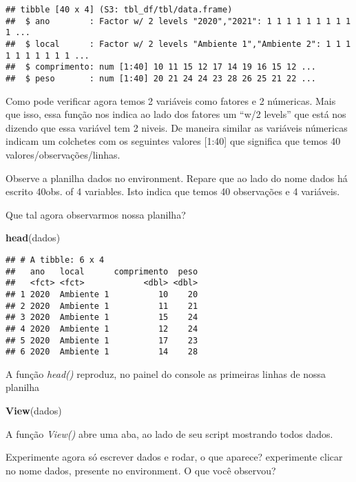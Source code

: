 \documentclass[]{book}
\newenvironment{Shaded}{\begin{snugshade}}{\end{snugshade}}
\newcommand{\KeywordTok}[1]{\textcolor[rgb]{0.13,0.29,0.53}{\textbf{#1}}}
\newcommand{\NormalTok}[1]{#1}
\begin{document}
\begin{verbatim}
## tibble [40 x 4] (S3: tbl_df/tbl/data.frame)
##  $ ano        : Factor w/ 2 levels "2020","2021": 1 1 1 1 1 1 1 1 1 1 ...
##  $ local      : Factor w/ 2 levels "Ambiente 1","Ambiente 2": 1 1 1 1 1 1 1 1 1 1 ...
##  $ comprimento: num [1:40] 10 11 15 12 17 14 19 16 15 12 ...
##  $ peso       : num [1:40] 20 21 24 24 23 28 26 25 21 22 ...
\end{verbatim}

Como pode verificar agora temos 2 variáveis como fatores e 2 númericas. Mais que isso, essa função nos indica ao lado dos fatores um ``w/2 levels'' que está nos dizendo que essa variável tem 2 niveis. De maneira similar as variáveis númericas indicam um colchetes com os seguintes valores {[}1:40{]} que significa que temos 40 valores/observações/linhas.

Observe a planilha dados no environment. Repare que ao lado do nome dados há escrito 40obs. of 4 variables. Isto indica que temos 40 observações e 4 variáveis.

Que tal agora observarmos nossa planilha?

\begin{Shaded}
\begin{Highlighting}[]
\KeywordTok{head}\NormalTok{(dados)}
\end{Highlighting}
\end{Shaded}

\begin{verbatim}
## # A tibble: 6 x 4
##   ano   local      comprimento  peso
##   <fct> <fct>            <dbl> <dbl>
## 1 2020  Ambiente 1          10    20
## 2 2020  Ambiente 1          11    21
## 3 2020  Ambiente 1          15    24
## 4 2020  Ambiente 1          12    24
## 5 2020  Ambiente 1          17    23
## 6 2020  Ambiente 1          14    28
\end{verbatim}

A função \emph{head()} reproduz, no painel do console as primeiras linhas de nossa planilha

\begin{Shaded}
\begin{Highlighting}[]
\KeywordTok{View}\NormalTok{(dados)}
\end{Highlighting}
\end{Shaded}

A função \emph{View()} abre uma aba, ao lado de seu script mostrando todos dados.

Experimente agora só escrever dados e rodar, o que aparece? experimente clicar no nome dados, presente no environment. O que você observou?
\end{document}
